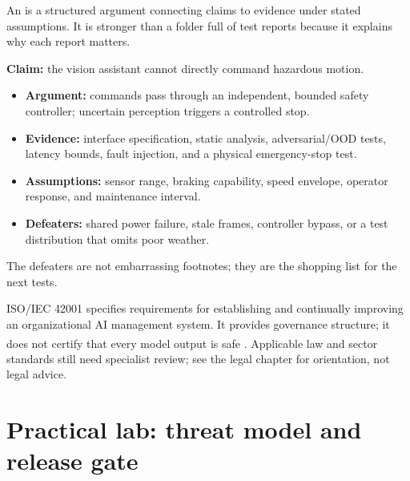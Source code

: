 An  is a structured argument connecting claims to
evidence under stated assumptions. It is stronger than a folder full of test
reports because it explains why each report matters.

\begin{workedexample}
\textbf{Claim:} the vision assistant cannot directly command hazardous motion.
\begin{itemize}
    \item \textbf{Argument:} commands pass through an independent, bounded
          safety controller; uncertain perception triggers a controlled stop.
    \item \textbf{Evidence:} interface specification, static analysis,
          adversarial/OOD tests, latency bounds, fault injection, and a physical
          emergency-stop test.
    \item \textbf{Assumptions:} sensor range, braking capability, speed
          envelope,
          operator response, and maintenance interval.
    \item \textbf{Defeaters:} shared power failure, stale frames, controller
          bypass, or a test distribution that omits poor weather.
\end{itemize}
The defeaters are not embarrassing footnotes; they are the shopping list for
the next tests.
\end{workedexample}

ISO/IEC 42001 specifies requirements for establishing and continually
improving an organizational AI management system. It provides governance
structure; it does not certify that every model output is safe
\textsuperscript{\cite{isoAIManagementSystems2023}}. Applicable law and sector
standards still need specialist review; see the legal chapter for orientation,
not legal advice.

\section{Practical lab: threat model and release gate}

